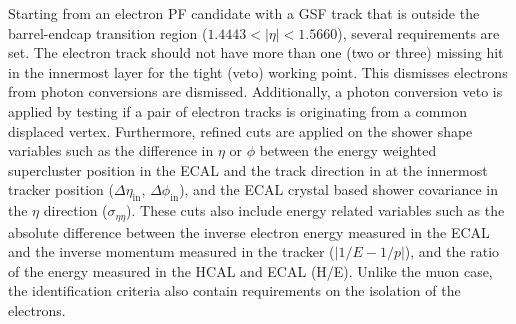 Starting from an electron PF candidate with a GSF track that is outside the barrel-endcap transition region ($1.4443 < |\eta| <1.5660$), several requirements are set. The electron track should not have more than one (two or three) missing hit in the innermost layer for the tight (veto) working point. This dismisses electrons from photon conversions are dismissed. Additionally, a photon conversion veto is applied by testing if a pair of electron tracks is originating from a common displaced vertex. Furthermore, refined cuts are applied on the shower shape variables such as the difference in $\eta$ or $\phi$ between the energy weighted supercluster position in the ECAL and the track direction in at the innermost tracker position ($\Delta \eta_{\mathrm{in}}$, $\Delta \phi_{\mathrm{in}}$), and the ECAL crystal based shower covariance in the $\eta$ direction ($\sigma_{\eta \eta}$). These cuts also include energy related variables such as the absolute difference between the inverse electron energy measured in the ECAL and the inverse momentum measured in the tracker ($|1/E-1/p|$), and the ratio of the energy measured in the HCAL and ECAL (H/E). Unlike the muon case, the identification criteria also contain requirements on the isolation of the electrons.


